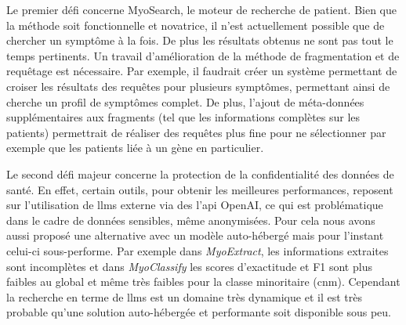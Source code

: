 Le premier défi concerne MyoSearch, le moteur de recherche de patient. Bien que la méthode soit fonctionnelle et novatrice, il n'est actuellement possible que de chercher un symptôme à la fois. De plus les résultats obtenus ne sont pas tout le temps pertinents. Un travail d'amélioration de la méthode de fragmentation et de requêtage est nécessaire. Par exemple, il faudrait créer un système permettant de croiser les résultats des requêtes pour plusieurs symptômes, permettant ainsi de cherche un profil de symptômes complet. De plus, l'ajout de méta-données supplémentaires aux fragments (tel que les informations complètes sur les patients) permettrait de réaliser des requêtes plus fine pour ne sélectionner par exemple que les patients liée à un gène en particulier.

Le second défi majeur concerne la protection de la confidentialité des données de santé. En effet, certain outils, pour obtenir les meilleures performances, reposent sur l'utilisation de \gls{llms} externe via des l'\gls{api} OpenAI, ce qui est problématique dans le cadre de données sensibles, même anonymisées. Pour cela nous avons aussi proposé une alternative avec un modèle auto-hébergé mais pour l'instant celui-ci sous-performe. Par exemple dans \textit{MyoExtract}, les informations extraites sont incomplètes et dans \textit{MyoClassify} les scores d'exactitude et F1 sont plus faibles au global et même très faibles pour la classe minoritaire (\gls{cnm}). Cependant la recherche en terme de \gls{llms} est un domaine très dynamique et il est très probable qu'une solution auto-hébergée et performante soit disponible sous peu.